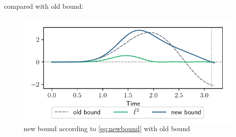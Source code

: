 \documentclass{book}
\numberwithin{equation}{section} %
\begin{document}
compared with old bound:
\begin{figure}[h!]
    \centering
    \includegraphics{alltheplots/newbound/corr12_beta1<beta2_bound_with_old_bound.pdf}
    \caption{new bound according to \cref{eq:newbound} with old bound}
    \label{fig:newbound_corr12_beta1<beta2_with_old}
\end{figure}
\end{document}
